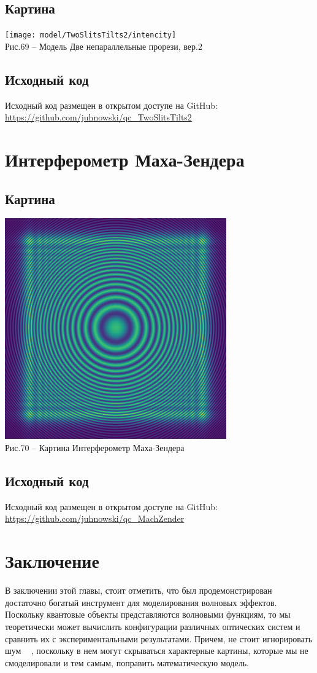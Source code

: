\documentclass[11pt]{report}
\begin{document}
\subsection{Картина}
\texttt{[image: model/TwoSlitsTilts2/intencity]} \\
Рис.69 -- Модель Две непараллельные прорези, вер.2 \\
\subsection{Исходный код}
Исходный код размещен в открытом доступе на GitHub: \url{https://github.com/juhnowski/qc_TwoSlitsTilts2}\\

\section{Интерферометр Маха-Зендера}
\subsection{Картина}
\includegraphics[scale=0.3]{model/MachZender/image} \\
Рис.70 -- Картина Интерферометр Маха-Зендера
\subsection{Исходный код}
Исходный код размещен в открытом доступе на GitHub: \url{https://github.com/juhnowski/qc_MachZender}\\


\section{Заключение}
В заключении этой главы, стоит отметить, что был продемонстрирован достаточно богатый инструмент для моделирования волновых эффектов. Поскольку квантовые объекты представляются волновыми функциям, то мы теоретически может вычислить конфигурации различных оптических систем и сравнить их с экспериментальными результатами. Причем, не стоит игнорировать шум ~\cite{noise} , поскольку в нем могут скрываться характерные картины, которые мы не смоделировали и тем самым, поправить математическую модель.
\end{document}
